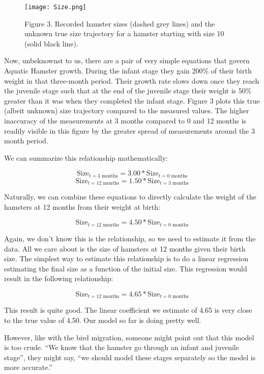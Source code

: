 \documentclass[]{memoir}
\makeatletter
\def\maxwidth{\ifdim\Gin@nat@width>\linewidth\linewidth
\else\Gin@nat@width\fi}
\let\Oldincludegraphics\includegraphics
\renewcommand{\includegraphics}[1]{\Oldincludegraphics[width=\maxwidth]{#1}}
\makeatother
\begin{document}
\begin{figure}[htbp]
\centering
\texttt{[image: Size.png]}
\caption{Figure 3. Recorded hamster sizes (dashed grey lines) and the
unknown true size trajectory for a hamster starting with size 10 (solid
black line).}
\end{figure}

Now, unbeknownst to us, there are a pair of very simple equations that
govern Aquatic Hamster growth. During the infant stage they gain 200\%
of their birth weight in that three-month period. Their growth rate
slows down once they reach the juvenile stage such that at the end of
the juvenile stage their weight is 50\% greater than it was when they
completed the infant stage. Figure 3 plots this true (albeit unknown)
size trajectory compared to the measured values. The higher inaccuracy
of the measurements at 3 months compared to 0 and 12 months is readily
visible in this figure by the greater spread of measurements around the
3 month period.

We can summarize this relationship mathematically:

\[ \text{Size}_{t=\text{3 months}} = 3.00 * \text{Size}_{t=\text{0 months}} \]
\[ \text{Size}_{t=\text{12 months}} = 1.50 * \text{Size}_{t=\text{3 months}} \]

Naturally, we can combine these equations to directly calculate the
weight of the hamsters at 12 months from their weight at birth:

\[ \text{Size}_{t=\text{12 months}} = 4.50 * \text{Size}_{t=\text{0 months}} \]

Again, we don't know this is the relationship, so we need to estimate it
from the data. All we care about is the size of hamsters at 12 months
given their birth size. The simplest way to estimate this relationship
is to do a linear regression estimating the final size as a function of
the initial size. This regression would result in the following
relationship:

\[ \text{Size}_{t=\text{12 months}} = 4.65 * \text{Size}_{t=\text{0 months}} \]

This result is quite good. The linear coefficient we estimate of 4.65 is
very close to the true value of 4.50. Our model so far is doing pretty
well.

However, like with the bird migration, someone might point out that this
model is too crude. ``We know that the hamster go through an infant and
juvenile stage'', they might say, ``we should model these stages
separately so the model is more accurate.''
\end{document}
